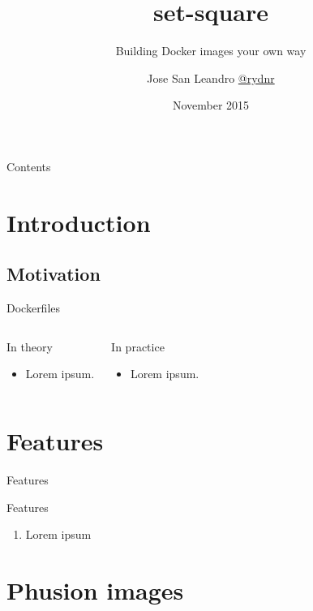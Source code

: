 \documentclass{beamer}
\title{set-square}
\subtitle{Building Docker images your own way}
\author{Jose San Leandro \href{http://twitter.com/rydnr}{@rydnr}}
\institute[OSOCO]{%
  \href{http://www.osoco.es}{OSOCO}
}
\date[11/2015]{November 2015}
\begin{document}
\begin{frame}[plain]
  \titlepage
\end{frame}

\begin{frame}[plain]{Contents}
  \tableofcontents[hideallsubsections]
\end{frame}

\section{Introduction}

\subsection{Motivation}

\begin{frame}{Dockerfiles}
	\begin{columns}[t]
		\begin{block}{In theory}
			\begin{itemize}
				\item Lorem ipsum.
			\end{itemize}
		\end{block}
		\pause

		\begin{block}{In practice}
			\begin{itemize}
				\item Lorem ipsum.
			\end{itemize}
		\end{block}

	\end{columns}
\end{frame}

\section{Features}

\begin{frame}{Features}
  \begin{block}{Features}
    \begin{enumerate}
    \item Lorem ipsum
    \end{enumerate}
  \end{block}
\end{frame}

\section{Phusion images}
\end{document}
